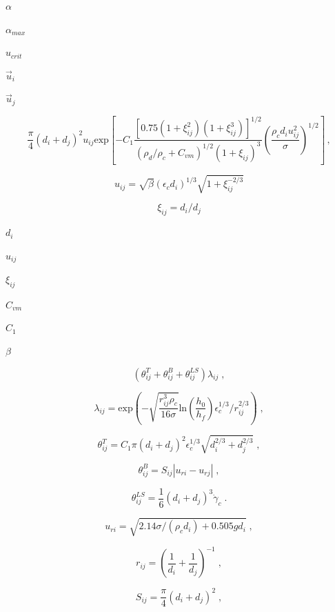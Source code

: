 \documentclass{article}
\begin{document}
$        \alpha       $
\pagebreak

$        \alpha_{max} $
\pagebreak

$        u_{crit}     $
\pagebreak

$        \vec{u}_i    $
\pagebreak

$        \vec{u}_j    $
\pagebreak

\[
    \frac{\pi}{4} (d_i + d_j)^2 u_{ij}
    \mathrm{exp}
    \left[
      - C_1
        \frac
        {[0.75(1 + \xi_{ij}^2)(1 + \xi_{ij}^3)]^{1/2}}
        {(\rho_d/\rho_c + C_{vm})^{1/2} (1 + \xi_{ij})^3}
        \left(\frac{\rho_c d_i u_{ij}^2}{\sigma}\right)^{1/2}
    \right]\,,
\]
\pagebreak

\[
    u_{ij} = \sqrt{\beta} (\epsilon_c d_i)^{1/3} \sqrt{1 + \xi_{ij}^{-2/3}}
\]
\pagebreak

\[
    \xi_{ij} = d_i/d_j
\]
\pagebreak

$        d_i         $
\pagebreak

$        u_{ij}      $
\pagebreak

$        \xi_{ij}    $
\pagebreak

$        C_{vm}      $
\pagebreak

$        C_1         $
\pagebreak

$        \beta       $
\pagebreak

\[
    \left( \theta_{ij}^{T} + \theta_{ij}^{B} + \theta_{ij}^{LS} \right)
    \lambda_{ij}\;,
\]
\pagebreak

\[
    \lambda_{ij} =
        \mathrm{exp}
        \left(
          - \sqrt{\frac{r_{ij}^3 \rho_c}{16 \sigma}}
            \mathrm{ln} \left(\frac{h_0}{h_f}\right)
            \epsilon_c^{1/3}/r_{ij}^{2/3}
        \right)\;,
\]
\pagebreak

\[
    \theta_{ij}^{T} =
        C_1 \pi (d_i + d_j)^{2} \epsilon_c^{1/3}
        \sqrt{d_{i}^{2/3} + d_{j}^{2/3}}\;,
\]
\pagebreak

\[
    \theta_{ij}^{B} = S_{ij} \left| u_{ri} - u_{rj} \right|\;,
\]
\pagebreak

\[
    \theta_{ij}^{LS} =
        \frac{1}{6} \left(d_i + d_j\right)^{3} \dot{\gamma}_c\;.
\]
\pagebreak

\[
    u_{ri} = \sqrt{2.14 \sigma / \left(\rho_c d_i \right) + 0.505 g d_i}\;,
\]
\pagebreak

\[
    r_{ij} = \left( \frac{1}{d_i} + \frac{1}{d_j} \right)^{-1}\;,
\]
\pagebreak

\[
    S_{ij} = \frac{\pi}{4} \left(d_i + d_j\right)^{2}\;,
\]
\pagebreak
\end{document}
